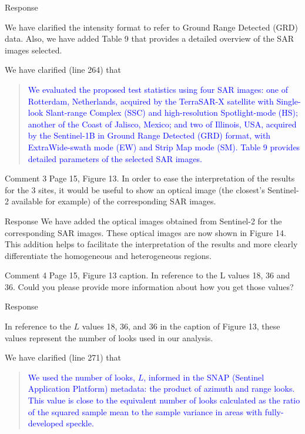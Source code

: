 \documentclass[11pt]{report}
\begin{document}
\begin{responsebox}{Response}

We have clarified the intensity format to refer to Ground Range Detected (GRD) data. Also, we have added Table 9 that provides a detailed overview of the SAR images selected.

We have clarified (line 264) that
\begin{quote}
	\textcolor{blue}{
	We evaluated the proposed test statistics using four SAR images: one of Rotterdam, 
Netherlands, acquired by the TerraSAR-X satellite with Single-look Slant-range Complex 
(SSC) and high-resolution Spotlight-mode (HS); another of the Coast of Jalisco, Mexico; and
two of Illinois, USA, acquired by the Sentinel-1B in Ground Range Detected (GRD) format, 
with ExtraWide-swath mode (EW) and Strip Map mode (SM). Table 9 provides detailed
parameters of the selected SAR images.
}
\end{quote}

\end{responsebox}

\begin{reviewbox}{Comment 3}
Page 15, Figure 13. In order to ease the interpretation of the results for the 3 sites, it would be useful to show an optical image (the closest's Sentinel-2 available for example) of the corresponding SAR images.
\end{reviewbox}
\begin{responsebox}{Response}
	We have added the optical images obtained from Sentinel-2 for the corresponding SAR images. These optical images are now shown in Figure 14. This addition helps to facilitate the interpretation of the results and more clearly differentiate the homogeneous and heterogeneous regions.
\end{responsebox}

\begin{reviewbox}{Comment 4}
Page 15, Figure 13 caption. In reference to the L values 18, 36 and 36. Could you please provide more information about how you get those values?
\end{reviewbox}
\begin{responsebox}{Response}

In reference to the $L$ values 18, 36, and 36 in the caption of Figure 13, these values represent the number of looks used in our analysis. 

We have clarified (line 271) that
\begin{quote}
	\textcolor{blue}{
We used the number of looks, $L$, informed in the SNAP (Sentinel Application Platform) metadata: the product of azimuth and range looks. 
This value is close to the equivalent number of looks calculated as the ratio of the squared sample mean to the sample variance in areas with fully-developed speckle.
}
\end{quote}

\end{responsebox}
\end{document}
